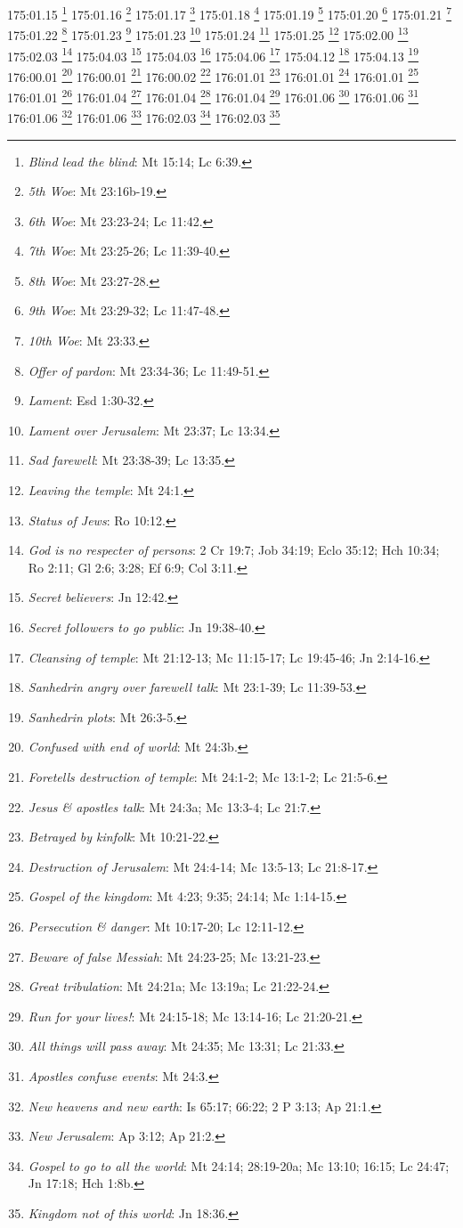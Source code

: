175:01.15 \footnote{\textit{Blind lead the blind}: Mt 15:14; Lc 6:39.}
175:01.16 \footnote{\textit{5th Woe}: Mt 23:16b-19.}
175:01.17 \footnote{\textit{6th Woe}: Mt 23:23-24; Lc 11:42.}
175:01.18 \footnote{\textit{7th Woe}: Mt 23:25-26; Lc 11:39-40.}
175:01.19 \footnote{\textit{8th Woe}: Mt 23:27-28.}
175:01.20 \footnote{\textit{9th Woe}: Mt 23:29-32; Lc 11:47-48.}
175:01.21 \footnote{\textit{10th Woe}: Mt 23:33.}
175:01.22 \footnote{\textit{Offer of pardon}: Mt 23:34-36; Lc 11:49-51.}
175:01.23 \footnote{\textit{Lament}: Esd 1:30-32.}
175:01.23 \footnote{\textit{Lament over Jerusalem}: Mt 23:37; Lc 13:34.}
175:01.24 \footnote{\textit{Sad farewell}: Mt 23:38-39; Lc 13:35.}
175:01.25 \footnote{\textit{Leaving the temple}: Mt 24:1.}
175:02.00 \footnote{\textit{Status of Jews}: Ro 10:12.}
175:02.03 \footnote{\textit{God is no respecter of persons}: 2 Cr 19:7; Job 34:19; Eclo 35:12; Hch 10:34; Ro 2:11; Gl 2:6; 3:28; Ef 6:9; Col 3:11.}
175:04.03 \footnote{\textit{Secret believers}: Jn 12:42.}
175:04.03 \footnote{\textit{Secret followers to go public}: Jn 19:38-40.}
175:04.06 \footnote{\textit{Cleansing of temple}: Mt 21:12-13; Mc 11:15-17; Lc 19:45-46; Jn 2:14-16.}
175:04.12 \footnote{\textit{Sanhedrin angry over farewell talk}: Mt 23:1-39; Lc 11:39-53.}
175:04.13 \footnote{\textit{Sanhedrin plots}: Mt 26:3-5.}
176:00.01 \footnote{\textit{Confused with end of world}: Mt 24:3b.}
176:00.01 \footnote{\textit{Foretells destruction of temple}: Mt 24:1-2; Mc 13:1-2; Lc 21:5-6.}
176:00.02 \footnote{\textit{Jesus & apostles talk}: Mt 24:3a; Mc 13:3-4; Lc 21:7.}
176:01.01 \footnote{\textit{Betrayed by kinfolk}: Mt 10:21-22.}
176:01.01 \footnote{\textit{Destruction of Jerusalem}: Mt 24:4-14; Mc 13:5-13; Lc 21:8-17.}
176:01.01 \footnote{\textit{Gospel of the kingdom}: Mt 4:23; 9:35; 24:14; Mc 1:14-15.}
176:01.01 \footnote{\textit{Persecution & danger}: Mt 10:17-20; Lc 12:11-12.}
176:01.04 \footnote{\textit{Beware of false Messiah}: Mt 24:23-25; Mc 13:21-23.}
176:01.04 \footnote{\textit{Great tribulation}: Mt 24:21a; Mc 13:19a; Lc 21:22-24.}
176:01.04 \footnote{\textit{Run for your lives!}: Mt 24:15-18; Mc 13:14-16; Lc 21:20-21.}
176:01.06 \footnote{\textit{All things will pass away}: Mt 24:35; Mc 13:31; Lc 21:33.}
176:01.06 \footnote{\textit{Apostles confuse events}: Mt 24:3.}
176:01.06 \footnote{\textit{New heavens and new earth}: Is 65:17; 66:22; 2 P 3:13; Ap 21:1.}
176:01.06 \footnote{\textit{New Jerusalem}: Ap 3:12; Ap 21:2.}
176:02.03 \footnote{\textit{Gospel to go to all the world}: Mt 24:14; 28:19-20a; Mc 13:10; 16:15; Lc 24:47; Jn 17:18; Hch 1:8b.}
176:02.03 \footnote{\textit{Kingdom not of this world}: Jn 18:36.}
